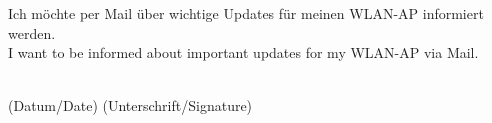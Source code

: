 \documentclass[a4paper,10pt]{scrartcl}
\let\xhrf\hrulefill
\let\hrulefill\xhrf
\begin{document}
\vfill


{\Large Ich möchte per Mail über wichtige Updates für meinen WLAN-AP informiert werden.\\
I want to be informed about important updates for my WLAN-AP via Mail.}

\vspace{3em}

\hrulefill \\
(Datum/Date) \hfill (Unterschrift/Signature) 

\vfill

\enlargethispage{40pt}

\end{document}
